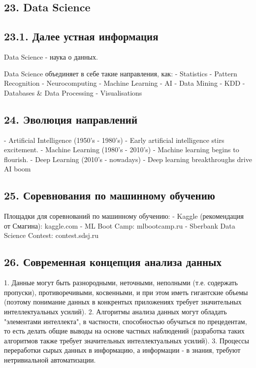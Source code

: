 \subsection{23. Data Science}

\subsection{23.1. Далее устная информация}

Data Science - наука о данных.

Data Science объединяет в себе такие направления, как:
- Statistics
- Pattern Recognition
- Neurocomputing
- Machine Learning
- AI
- Data Mining
- KDD
- Databases \& Data Processing
- Visualisations

\subsection{24. Эволюция направлений}

- Artificial Intelligence (1950's - 1980's)
    - Early artificial intelligence stirs excitement.
- Machine Learning (1980's - 2010's)
    - Machine learning begins to flourish.
- Deep Learning (2010's - nowadays)
    - Deep learning breakthroughs drive AI boom

\subsection{25. Соревнования по машинному обучению}

Площадки для соревнований по машинному обучению:
- Kaggle (рекомендация от Смагина): kaggle.com
- ML Boot Camp: mlbootcamp.ru
- Sberbank Data Science Contest: contest.sdsj.ru

\subsection{26. Современная концепция анализа данных}

1. Данные могут быть разнородными, неточными, неполными (т.е. содержать
пропуски), противоречивыми, косвенными, и при этом иметь гигантские объемы
(поэтому понимание данных в конкрентых приложениях требует значительных
интеллектуальных усилий).
2. Алгоритмы анализа данных могут обладать "элементами интеллекта",
в частности, способностью обучаться по прецедентам, то есть делать общие
выводы на основе частных наблюдений (разработка таких алгоритмов также
требует значительных интеллектуальных усилий).
3. Процессы переработки сырых данных в информацию, а информации - в знания,
требуют нетривиальной автоматизации.

